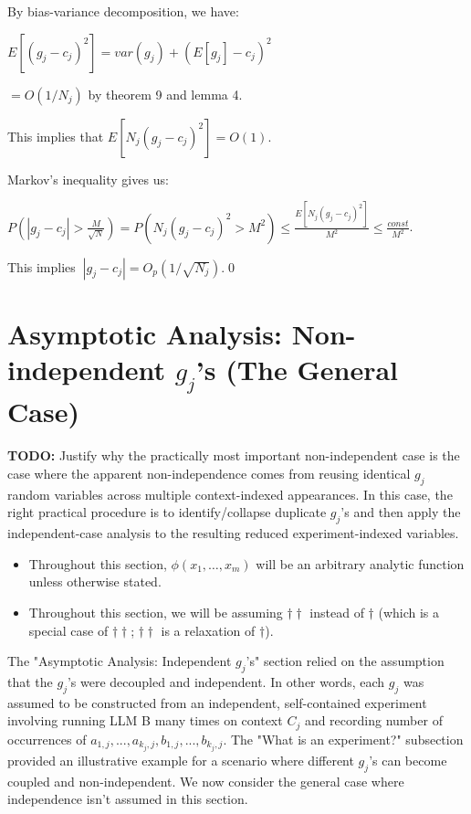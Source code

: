 \documentclass{article}
\begin{document}
By bias-variance decomposition, we have:

$\displaystyle E\left[\left( g_{j} -c_{j}\right)^{2}\right] =var\left( g_{j}\right) +\left( E\left[ g_{j}\right] -c_{j}\right)^{2}$

$\displaystyle =O\left( 1/N_{j}\right)$ by theorem 9 and lemma 4.

This implies that $\displaystyle E\left[ N_{j}\left( g_{j} -c_{j}\right)^{2}\right] =O\left( 1\right)$.

Markov's inequality gives us:

$\displaystyle P\left( |g_{j} -c_{j} | >\frac{M}{\sqrt{N}}\right) =P\left( N_{j}\left( g_{j} -c_{j}\right)^{2}  >M^{2}\right) \leqslant \frac{E\left[ N_{j}\left( g_{j} -c_{j}\right)^{2}\right]}{M^{2}} \leqslant \frac{const}{M^{2}}$.

This implies $\displaystyle \ |g_{j} -c_{j} |=O_{p}\left( 1/\sqrt{N_{j}}\right)$.\qed 



\section{Asymptotic Analysis: Non-independent $g_{j}$'s (The General Case)}

\textbf{TODO:} Justify why the practically most important non-independent case is the case where the apparent non-independence comes from reusing identical $\displaystyle g_{j}$ random variables across multiple context-indexed appearances. In this case, the right practical procedure is to identify/collapse duplicate $\displaystyle g_{j}$'s and then apply the independent-case analysis to the resulting reduced experiment-indexed variables.

\begin{mdframed}
    \begin{itemize}
    \item Throughout this section, $\phi(x_1, \dots, x_m)$ will be an arbitrary analytic function unless otherwise stated.
    \item Throughout this section, we will be assuming $\dagger\dagger$ instead of $\dagger$ (which is a special case of $\dagger\dagger$; $\dagger\dagger$ is a relaxation of $\dagger$).
\end{itemize}
\end{mdframed}


The "Asymptotic Analysis: Independent $\displaystyle g_{j}$'s" section relied on the assumption that the $\displaystyle g_{j}$'s were decoupled and independent. In other words, each $\displaystyle g_{j}$ was assumed to be constructed from an independent, self-contained experiment involving running LLM B many times on context $\displaystyle C_{j}$ and recording number of occurrences of $\displaystyle a_{1,j} ,...,a_{k_{j} ,j} ,b_{1,j} ,...,b_{k_{j} ,j}$. The "What is an experiment?" subsection provided an illustrative example for a scenario where different $\displaystyle g_{j}$'s can become coupled and non-independent. We now consider the general case where independence isn't assumed in this section.
\end{document}
